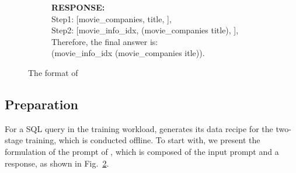 \begin{figure}
    \vspace{-3ex}
    \begin{subfigure}{}
        \centering
        \label{fig:query_instruct:response}
        \begin{tcolorbox}[colback=yellow!10!white, colframe=blue!75!black]
            \textbf{RESPONSE:}\\
            Step1: [movie\_companies, title, \HashJoin], \\
            Step2: [movie\_info\_idx, \HashJoin(movie\_companies title), \HashJoin], \\
            Therefore, the final answer is: \\ \HashJoin (movie\_info\_idx \HashJoin(movie\_companies itle)).
        \end{tcolorbox}
        \label{fig:query_instruct:response}
    \end{subfigure}
    \caption{The format of \QueryInstruct}
    \label{fig:query_instruct} %
\end{figure}

\subsection{\QueryInstruct Preparation}
\label{sec:method:query_instruct:prepare}
For a SQL query in the training workload, \LLMQO generates its data recipe for the two-stage training, which is conducted offline.
To start with, we present the formulation of the prompt of \LLMQO, which is composed of the input prompt and a response, as shown in Fig.~\ref{fig:query_instruct}. 

